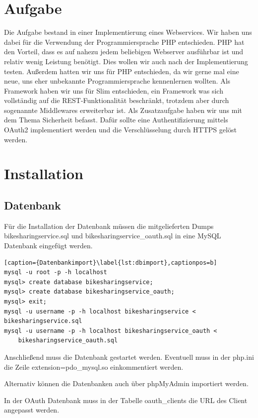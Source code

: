 \chapter{Aufgabe}

Die Aufgabe bestand in einer Implementierung eines Webservices. Wir haben uns dabei für die Verwendung der Programmiersprache PHP entschieden. PHP hat den Vorteil, dass es auf nahezu jedem beliebigen Webserver ausführbar ist und relativ wenig Leistung benötigt. Dies wollen wir auch nach der Implementierung testen. Außerdem hatten wir uns für PHP entschieden, da wir gerne mal eine neue, uns eher unbekannte Programmiersprache kennenlernen wollten.
Als Framework haben wir uns für Slim\cite{slim} entschieden, ein Framework was sich vollständig auf die REST-Funktionalität beschränkt, trotzdem aber durch sogenannte Middlewares erweiterbar ist.
Als Zusatzaufgabe haben wir uns mit dem Thema Sicherheit befasst. Dafür sollte eine Authentifizierung mittels OAuth2\cite{oauth} implementiert werden und die Verschlüsselung durch HTTPS gelöst werden.


\chapter{Installation}
\section{Datenbank}
Für die Installation der Datenbank müssen die mitgelieferten Dumps bikesharingservice.sql und bikesharingservice\_oauth.sql in eine MySQL Datenbank eingefügt werden.
\begin{lstlisting}[caption={Datenbankimport}\label{lst:dbimport},captionpos=b] 
mysql -u root -p -h localhost
mysql> create database bikesharingservice;
mysql> create database bikesharingservice_oauth;
mysql> exit;
mysql -u username -p -h localhost bikesharingservice < bikesharingservice.sql
mysql -u username -p -h localhost bikesharingservice_oauth < 
	bikesharingservice_oauth.sql
\end{lstlisting}
Anschließend muss die Datenbank gestartet werden.
Eventuell muss in der php.ini die Zeile extension=pdo\_mysql.so einkommentiert werden.

Alternativ können die Datenbanken auch über phpMyAdmin importiert werden.

In der OAuth Datenbank muss in der Tabelle oauth\_clients die URL des Client angepasst werden.

